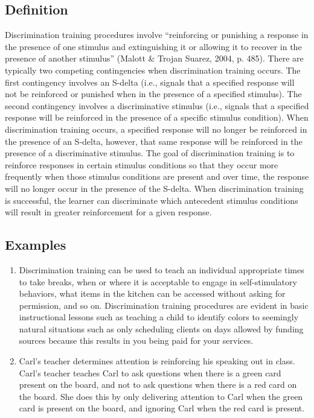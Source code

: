 \subsection{Definition}
Discrimination training procedures involve ``reinforcing or punishing a response in the presence of one stimulus and extinguishing it or allowing it to recover in the presence of another stimulus'' (Malott \& Trojan Suarez, 2004, p. 485). There are typically two competing contingencies when discrimination training occurs.  The first contingency involves an S-delta (i.e., signals that a specified response will not be reinforced or punished when in the presence of a specified stimulus). The second contingency involves a discriminative stimulus (i.e., signals that a specified response will be reinforced in the presence of a specific stimulus condition). When discrimination training occurs, a specified response will no longer be reinforced in the presence of an S-delta, however, that same response will be reinforced in the presence of a discriminative stimulus. The goal of discrimination training is to reinforce responses in certain stimulus conditions so that they occur more frequently when those stimulus conditions are present and over time, the response will no longer occur in the presence of the S-delta. When discrimination training is successful, the learner can discriminate which antecedent stimulus conditions will result in greater reinforcement for a given response. 
%
\subsection{Examples}
\begin{enumerate}
\item Discrimination training can be used to teach an individual appropriate times to take breaks, when or where it is acceptable to engage in self-stimulatory behaviors, what items in the kitchen can be accessed without asking for permission, and so on. Discrimination training procedures are evident in basic instructional lessons such as teaching a child to identify colors to seemingly natural situations such as only scheduling clients on days allowed by funding sources because this results in you being paid for your services. 
\item Carl's teacher determines attention is reinforcing his speaking out in class. Carl's teacher teaches Carl to ask questions when there is a green card present on the board, and not to ask questions when there is a red card on the board. She does this by only delivering attention to Carl when the green card is present on the board, and ignoring Carl when the red card is present. 
\end{enumerate}
%
